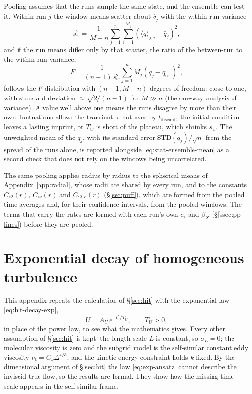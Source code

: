 \documentclass{article}
\begin{document}
Pooling assumes that the runs sample the same state, and the ensemble can test
it. Within run $j$ the window means scatter about $\bar q_j$ with the
within-run variance
\begin{equation}\label{eq:stat-ensemble-within}
  s_w^2 = \frac{1}{M - n} \sum_{j=1}^{n} \sum_{i=1}^{M_j}
  \left( \langle q \rangle_{j,i} - \bar q_j \right)^2 ,
\end{equation}
and if the run means differ only by that scatter, the ratio of the
between-run to the within-run variance,
\begin{equation}\label{eq:stat-ensemble-F}
  F = \frac{1}{(n - 1)\, s_w^2} \sum_{j=1}^{n} M_j \left( \bar q_j - q_{\mathrm{est}} \right)^2 ,
\end{equation}
follows the $F$ distribution with $(n - 1, M - n)$ degrees of freedom: close
to one, with standard deviation $\approx \sqrt{2/(n - 1)}$ for $M \gg n$
(the one-way analysis of variance). A value well above one means the runs
disagree by more than their own fluctuations allow: the transient is not over
by $t_{\mathrm{discard}}$, the initial condition leaves a lasting imprint, or
$T_w$ is short of the plateau, which shrinks $s_w$. The unweighted mean of the
$\bar q_j$, with its standard error $\mathrm{STD}(\bar q_j)/\sqrt{n}$ from
the spread of the runs alone, is reported alongside \eqref{eq:stat-ensemble-mean}
as a second check that does not rely on the windows being uncorrelated.

The same pooling applies radius by radius to the spherical means of
Appendix~\ref{app:radial}, whose radii are shared by every run, and to the
constants $C_{\epsilon 2}(r)$, $C_{\epsilon\nu}(r)$ and
$C_{\epsilon 2,\mathrm{c}}(r)$ (\S\ref{sec:puff}), which are
formed from the pooled time averages and, for their confidence intervals, from
the pooled windows. The terms that carry the rates are formed with each run's
own $c_\tau$ and $\beta_X$ (\S\ref{ssec:pp-lines}) before they are pooled.

\section{Exponential decay of homogeneous turbulence}\label{app:hit-exp}
This appendix repeats the calculation of \S\ref{sec:hit} with the exponential
law \eqref{eq:hit-decay-exp},
\begin{equation}\label{eq:exp-ansatz}
  U = A_U\, e^{-t^*/T_U}, \qquad T_U > 0 ,
\end{equation}
in place of the power law, to see what the mathematics gives. Every other
assumption of \S\ref{sec:hit} is kept: the length scale $L$ is constant, so
$\sigma_L = 0$; the molecular viscosity is zero and the subgrid model is the
self-similar constant eddy viscosity $\nu_{\mathrm{t}} = C_\nu \Delta^{4/3}$;
and the kinetic energy constraint holds $\overline{k}$ fixed. By the
dimensional argument of \S\ref{sec:hit} the law \eqref{eq:exp-ansatz} cannot
describe the inviscid true flow, so the results are formal. They show how the
missing time scale appears in the self-similar frame.
\end{document}
